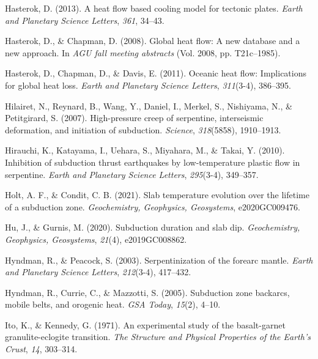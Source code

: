 \begin{CSLReferences}{1}{1}
\leavevmode{}%
Hasterok, D. (2013). A heat flow based cooling model for tectonic plates. \emph{Earth and Planetary Science Letters}, \emph{361}, 34--43.

\leavevmode{}%
Hasterok, D., \& Chapman, D. (2008). Global heat flow: A new database and a new approach. In \emph{AGU fall meeting abstracts} (Vol. 2008, pp. T21c--1985).

\leavevmode{}%
Hasterok, D., Chapman, D., \& Davis, E. (2011). Oceanic heat flow: Implications for global heat loss. \emph{Earth and Planetary Science Letters}, \emph{311}(3-4), 386--395.

\leavevmode{}%
Hilairet, N., Reynard, B., Wang, Y., Daniel, I., Merkel, S., Nishiyama, N., \& Petitgirard, S. (2007). High-pressure creep of serpentine, interseismic deformation, and initiation of subduction. \emph{Science}, \emph{318}(5858), 1910--1913.

\leavevmode{}%
Hirauchi, K., Katayama, I., Uehara, S., Miyahara, M., \& Takai, Y. (2010). Inhibition of subduction thrust earthquakes by low-temperature plastic flow in serpentine. \emph{Earth and Planetary Science Letters}, \emph{295}(3-4), 349--357.

\leavevmode{}%
Holt, A. F., \& Condit, C. B. (2021). Slab temperature evolution over the lifetime of a subduction zone. \emph{Geochemistry, Geophysics, Geosystems}, e2020GC009476.

\leavevmode{}%
Hu, J., \& Gurnis, M. (2020). Subduction duration and slab dip. \emph{Geochemistry, Geophysics, Geosystems}, \emph{21}(4), e2019GC008862.

\leavevmode{}%
Hyndman, R., \& Peacock, S. (2003). Serpentinization of the forearc mantle. \emph{Earth and Planetary Science Letters}, \emph{212}(3-4), 417--432.

\leavevmode{}%
Hyndman, R., Currie, C., \& Mazzotti, S. (2005). Subduction zone backarcs, mobile belts, and orogenic heat. \emph{GSA Today}, \emph{15}(2), 4--10.

\leavevmode{}%
Ito, K., \& Kennedy, G. (1971). An experimental study of the basalt-garnet granulite-eclogite transition. \emph{The Structure and Physical Properties of the Earth's Crust}, \emph{14}, 303--314.


\end{CSLReferences}
